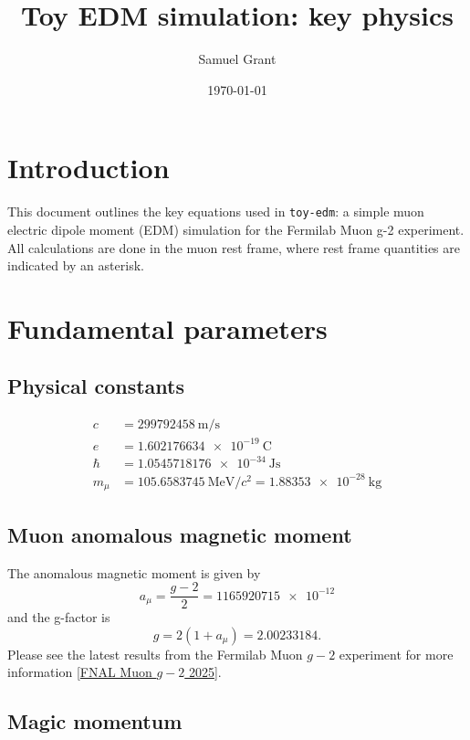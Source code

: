 \documentclass[11pt]{article}
\title{Toy EDM simulation: key physics}
\author{Samuel Grant}
\date{\today}
\begin{document}
\maketitle

\section{Introduction}

This document outlines the key equations used in \texttt{toy-edm}: a simple muon electric dipole moment (EDM) simulation for the Fermilab Muon g-2 experiment. All calculations are done in the muon rest frame, where rest frame quantities are indicated by an asterisk.

\section{Fundamental parameters}

\subsection{Physical constants}
\begin{align}
c &= \SI{299792458}{\meter\per\second} \\
e &= \SI{1.602176634e-19}{\coulomb} \\
\hbar &= \SI{1.0545718176e-34}{\joule\second} \\
m_\mu &= \SI{105.6583745}{\mega\electronvolt\per c^2} = \SI{1.88353e-28}{\kilogram}
\end{align}

\subsection{Muon anomalous magnetic moment}

The anomalous magnetic moment is given by
%
\begin{equation}
a_\mu = \frac{g-2}{2} = \num{1165920715e-12}
\end{equation}
%
and the g-factor is
\begin{equation}
g = 2(1 + a_\mu) = \num{2.00233184}.
\end{equation}
%
Please see the latest results from the Fermilab Muon $g-2$ experiment for more information [\href{https://arxiv.org/abs/2506.03069}{FNAL Muon $g-2$ 2025}].

\subsection{Magic momentum}
\end{document}
